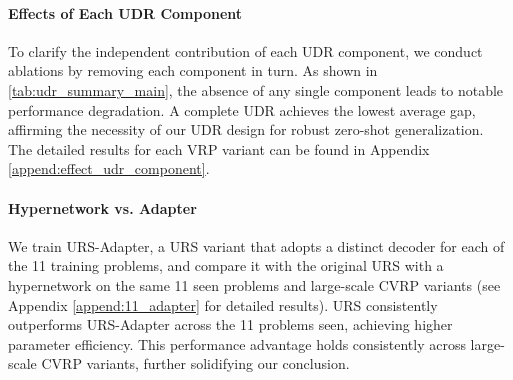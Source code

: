 \documentclass{article}
\theoremstyle{plain}
\theoremstyle{definition}
\theoremstyle{remark}
\begin{document}
\begin{table}[t]
  \centering 
  \caption{Performance comparison of ablating each UDR component (i.e., $\bm{\rho}$, $\bm{\omega}$, and $\bm{\xi}$)  on seen and unseen variants. Since removing positional identifiers $\bm{\rho}$ prevents the use of instance augmentation, this augmentation technique is disabled across all results to maintain a consistent inference strategy.}
  \label{tab:udr_summary_main}%
\end{table}%
\paragraph{Effects of Each UDR Component}
To clarify the independent contribution of each UDR component, we conduct ablations by removing each component in turn. As shown in \cref{tab:udr_summary_main}, the absence of any single component leads to notable performance degradation. A complete UDR achieves the lowest average gap, affirming the necessity of our UDR design for robust zero-shot generalization. The detailed results for each VRP variant can be found in Appendix \ref{append:effect_udr_component}.

\paragraph{Hypernetwork vs. Adapter}
We train URS-Adapter, a URS variant that adopts a distinct decoder for each of the 11 training problems, and compare it with the original URS with a hypernetwork on the same 11 seen problems and large-scale CVRP variants (see Appendix \ref{append:11_adapter} for detailed results). URS consistently outperforms URS-Adapter across the 11 problems seen, achieving higher parameter efficiency. This performance advantage holds consistently across large-scale CVRP variants, further solidifying our conclusion.
\end{document}
